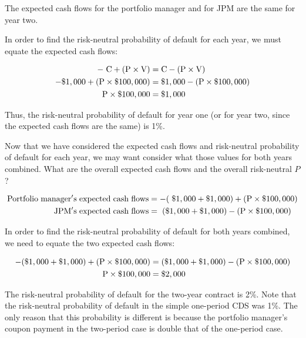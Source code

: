\documentclass{jss}
\begin{document}
The expected cash flows for the portfolio manager and for JPM are the same for year two. 

In order to find the risk-neutral probability of default for each year, we must equate the expected cash flows:

\label{eqn:SimpleTwoPeriod}
\begin{align}
  \rm -\hspace{3pt}C + (P \times V)  &= \rm C - (P \times V) \\
  \rm - \$1,000 + (P \times \$100,000) &= \rm \$1,000 - (P \times \$100,000) \\
  \rm P \times {\$100,000}  &= \rm \$1,000
\end{align}


Thus, the risk-neutral probability of default for year one (or for year two, since the expected cash flows are the same) is 1\%. 

Now that we have considered the expected cash flows and risk-neutral probability of default for each year, we may want consider what those values for both years combined. What are the overall expected cash flows and the overall risk-neutral $P$?

\begin{align}
  \rm Portfolio\hspace{3pt}manager's\hspace{3pt}expected\hspace{3pt}cash\hspace{3pt}flows &= \rm -(\hspace{3pt}\$1,000 + \$1,000) + (P \times {\$100,000}) \\
  \rm JPM's\hspace{3pt}expected\hspace{3pt}cash\hspace{3pt}flows &= \rm \hspace{3pt}(\$1,000 + \$1,000) - (P \times {\$100,000})
  \end{align}

In order to find the risk-neutral probability of default for both years combined, we need to equate the two expected cash flows:

\label{eqn:twoPeriod}
\begin{align}
  \rm - (\$1,000 + \$1,000) + (P \times \$100,000) &= \rm (\$1,000 + \$1,000) - (P \times \$100,000) \\
  \rm P \times {\$100,000}  &= \rm \$2,000
\end{align}

The risk-neutral probability of default for the two-year contract is 2\%. Note that the risk-neutral probability of default in the simple one-period CDS was 1\%. The only reason that this probability is different is because the portfolio manager's coupon payment in the two-period case is double that of the one-period case.
\end{document}
